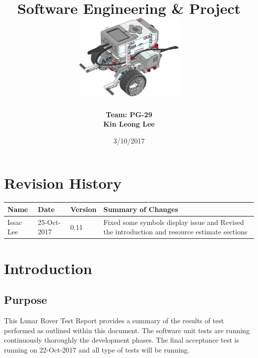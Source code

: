 \documentclass[10pt,a4paper,titlepage]{article}
\begin{document}
	
	\begin{titlepage}
		
		\title{
			\fontsize{50}{12}\\
			\vspace{20pt}
			\fontsize{20}{12}\\
			\vspace{10pt}
			\large{Software Engineering \& Project} \\
			\vspace{20pt}
			\includegraphics[width=200px]{title-page-ev3.png}					
		}
		\date{3/10/2017}
		\author{
			\bf{Team: PG-29} \\
			Kin Leong Lee \\
		}
		\maketitle
	\end{titlepage}
		 
	\tableofcontents	
	\listoftables
		
	\section*{Revision History}	
	\label{revtable}	
	\begin{tabular}{|p{2.1cm}|p{2.5cm}|p{2cm}|p{4.1cm}|}		
		\hline 
		\textbf {Name} & \textbf{Date} & \textbf {Version} &\textbf {Summary of Changes} \\ \hline
		Issac Lee & 25-Oct-2017 & 0.11 & Fixed some symbols display issue and Revised the introduction and resource estimate sections\\ \hline
		\hline 
		\hline 		
	\end{tabular}

	\newpage	
	\section{Introduction}
		\subsection{Purpose}
		This Lunar Rover Test Report provides a summary of the results of test performed as outlined within this document. The software unit tests are running continuously thoroughly the development phases. The final acceptance test is running on 22-Oct-2017 and all type of tests will be running.
	
\end{document}
